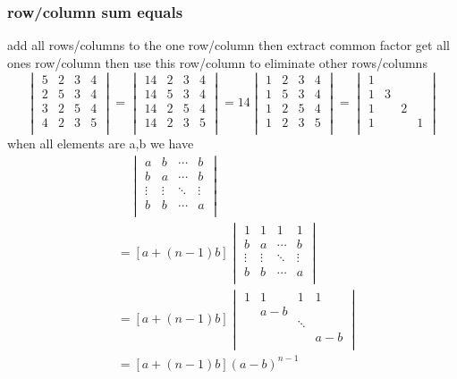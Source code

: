 \documentclass{overview}
\begin{document}
\subsubsection{row/column sum equals}
add all rows/columns to the one row/column
then extract common factor get all ones row/column
then use this row/column to eliminate other rows/columns
\[
\begin{vmatrix}
	5 & 2 & 3 & 4 \\
	2 & 5 & 3 & 4 \\
	3 & 2 & 5 & 4 \\
	4 & 2 & 3 & 5 \\
\end{vmatrix}
=
\begin{vmatrix}
	14 & 2 & 3 & 4 \\
	14 & 5 & 3 & 4 \\
	14 & 2 & 5 & 4 \\
	14 & 2 & 3 & 5 \\
\end{vmatrix}
=
14\begin{vmatrix}
	1 & 2 & 3 & 4 \\
	1 & 5 & 3 & 4 \\
	1 & 2 & 5 & 4 \\
	1 & 2 & 3 & 5 \\
\end{vmatrix}
=
\begin{vmatrix}
	1 &  &  &  \\
	1 & 3 &  &  \\
	1 &  & 2 &  \\
	1 &  &  & 1 \\
\end{vmatrix}
\] 
when all elements are a,b we have
\[
	\begin{aligned}
&\quad\begin{vmatrix}
	a & b & \cdots & b \\
	b & a & \cdots & b \\
	\vdots & \vdots & \ddots & \vdots \\
	b & b & \cdots & a \\
\end{vmatrix} \\
&=[a+(n-1)b]
\begin{vmatrix}
	1 & 1 & 1 & 1 \\
	b & a & \cdots & b \\
	\vdots & \vdots & \ddots & \vdots \\
	b & b & \cdots & a \\
\end{vmatrix} \\
&=[a+(n-1)b]
\begin{vmatrix}
	1 & 1 & 1 & 1 \\
	 & a-b &  &  \\
	 &  & \ddots &  \\
	 &  &  & a-b \\
\end{vmatrix}\\
&=
[a+(n-1)b](a-b)^{n-1}
\end{aligned}
\] 
\end{document}

